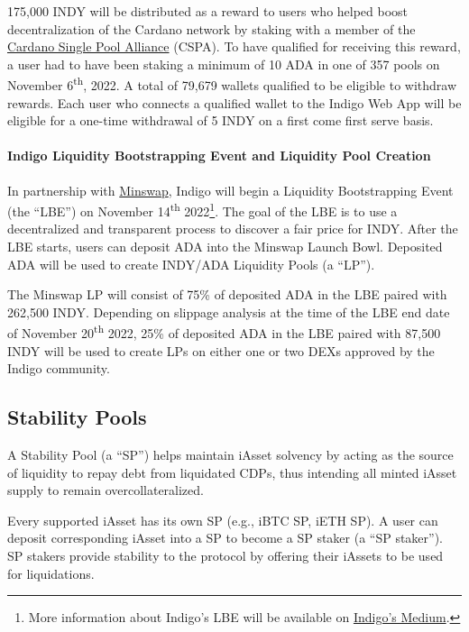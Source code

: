 \documentclass{article}
\begin{document}
\begin{sloppypar}
175,000 INDY will be distributed as a reward to users who helped boost
decentralization of the Cardano network by staking with a member of the
\href{https://singlepoolalliance.net/}{Cardano Single Pool Alliance}
(CSPA). To have qualified for receiving this reward, a user had to have
been staking a minimum of 10 ADA in one of 357 pools on November
6\textsuperscript{th}, 2022. A total of 79,679 wallets qualified to be
eligible to withdraw rewards. Each user who connects a qualified wallet
to the Indigo Web App will be eligible for a one-time withdrawal of 5
INDY on a first come first serve basis.

\hypertarget{indigo-liquidity-bootstrapping-event-and-liquidity-pool-creation}{%
\paragraph{Indigo Liquidity Bootstrapping Event and Liquidity Pool
Creation}\label{indigo-liquidity-bootstrapping-event-and-liquidity-pool-creation}}

In partnership with \href{https://minswap.org/}{Minswap}, Indigo will
begin a Liquidity Bootstrapping Event (the ``LBE'') on November
14\textsuperscript{th} 2022\footnote{More information about Indigo's LBE
  will be available on
  \href{https://indigoprotocol1.medium.com/}{Indigo's Medium}.}. The
goal of the LBE is to use a decentralized and transparent process to
discover a fair price for INDY. After the LBE starts, users can deposit
ADA into the Minswap Launch Bowl. Deposited ADA will be used to create
INDY/ADA Liquidity Pools (a ``LP'').

The Minswap LP will consist of 75\% of deposited ADA in the LBE paired
with 262,500 INDY. Depending on slippage analysis at the time of the LBE
end date of November 20\textsuperscript{th} 2022, 25\% of deposited ADA
in the LBE paired with 87,500 INDY will be used to create LPs on either
one or two DEXs approved by the Indigo community.

\hypertarget{stability-pools}{%
\subsection{Stability Pools}\label{stability-pools}}

A Stability Pool (a ``SP'') helps maintain iAsset solvency by acting as
the source of liquidity to repay debt from liquidated CDPs, thus
intending all minted iAsset supply to remain overcollateralized.

Every supported iAsset has its own SP (e.g., iBTC SP, iETH SP). A user
can deposit corresponding iAsset into a SP to become a SP staker (a ``SP
staker''). SP stakers provide stability to the protocol by offering
their iAssets to be used for liquidations.


\end{sloppypar}
\end{document}
